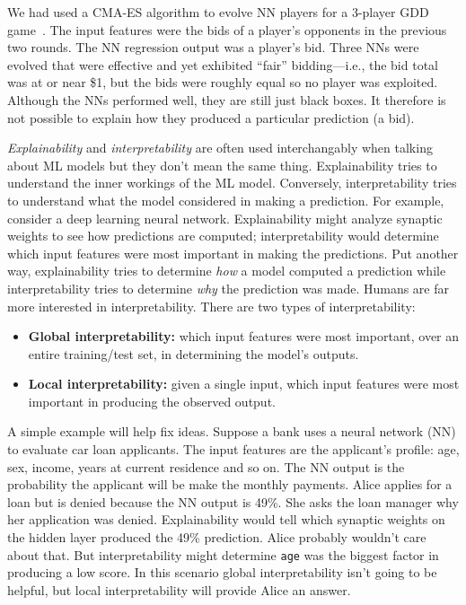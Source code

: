 \documentclass[journal]{IEEEtran} %
\begin{document}
We had used a CMA-ES algorithm to evolve NN players for a 3-player GDD game~\cite{gree1}. The input features were the bids of a player's opponents in the previous two rounds. The NN regression output was a player's bid. Three NNs were evolved that were effective and yet exhibited ``fair'' bidding---i.e., the bid total was at or near \$1, but the bids were roughly equal so no player was exploited. Although the NNs performed well, they are still just black boxes. 
It therefore is not possible to explain how they produced a particular prediction (a bid).

\emph{Explainability} and \emph{interpretability} are often used interchangably when talking about ML models but they don't mean the same thing. Explainability tries to understand the inner workings of the ML model. Conversely, interpretability tries to understand what the model considered in making a prediction. For example, consider a deep learning neural network. Explainability might analyze synaptic weights to see how predictions are computed; interpretability would determine which input features were most important in making the predictions. Put another way, explainability tries to determine \emph{how} a model computed a prediction while interpretability tries to determine \emph{why} the prediction was made. Humans are far more interested in interpretability.
There are two types of interpretability:
\begin{itemize}
    \item {\bf Global interpretability:} which input features were most important, over an entire training/test set, in determining the model's outputs.
    \item {\bf Local interpretability:} given a single input, which input features were most important in producing the observed output. 
\end{itemize}


A simple example will help fix ideas. Suppose a bank uses a neural network (NN) to evaluate car loan applicants. The input features are the applicant's profile: age, sex, income, years at current residence and so on. The NN output is the probability the applicant will be make the monthly payments. Alice applies for a loan but is denied because the NN output is 49\%. She asks the loan manager why her application was denied. Explainability would tell which synaptic weights on the hidden layer produced the 49\% prediction. Alice probably wouldn't care about that. But interpretability might determine \verb|age| was the biggest factor in producing a low score. 
In this scenario global interpretability isn't going to be helpful, but local interpretability will provide Alice an answer.
\end{document}
